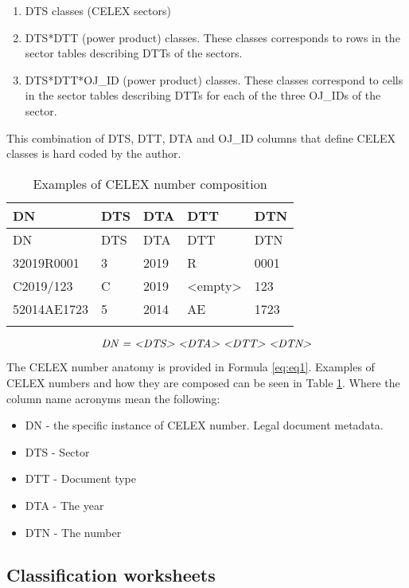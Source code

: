 \begin{enumerate}
\item
  DTS classes (CELEX sectors)
\item
  DTS*DTT (power product) classes. These classes corresponds to rows in
  the sector tables describing DTTs of the sectors.
\item
  DTS*DTT*OJ\_ID (power product) classes. These classes correspond to
  cells in the sector tables describing DTTs for each of the three
  OJ\_IDs of the sector.
\end{enumerate}

This combination of DTS, DTT, DTA and OJ\_ID columns that define CELEX
classes is hard coded by the author.

\begin{longtable}[!ht]{@{}p{3.2cm}p{2cm}p{2cm}p{2cm}p{2cm}@{}}
	\toprule
	DN & DTS & DTA & DTT & DTN\tabularnewline
	\midrule
	\endfirsthead
	\toprule
	DN & DTS & DTA & DTT & DTN\tabularnewline
	\midrule
	\endhead
	32019R0001 & 3 & 2019 & R & 0001\tabularnewline
	C2019/123 & C & 2019 & \textless{}empty\textgreater{} &
	123\tabularnewline
	52014AE1723 & 5 & 2014 & AE & 1723\tabularnewline
	\bottomrule
	\caption{Examples of CELEX number composition}
	\label{tab:ex2}
	\vspace{-10pt}
\end{longtable}

\begin{equation}
	\emph{DN =
		\textless{}DTS\textgreater{} \textless{}DTA\textgreater{}
		\textless{}DTT\textgreater{} \textless{}DTN\textgreater{}}
	\label{eq:eq1}
\end{equation}

The CELEX number anatomy is provided in Formula \ref{eq:eq1}. Examples of
CELEX numbers and how they are composed can be seen in Table \ref{tab:ex2}. Where the
column name acronyms mean the following:

\begin{itemize}

\item
  DN - the specific instance of CELEX number. Legal document metadata.
\item
  DTS - Sector
\item
  DTT - Document type
\item
  DTA - The year
\item
  DTN - The number
\end{itemize}


\subsection{Classification worksheets}

